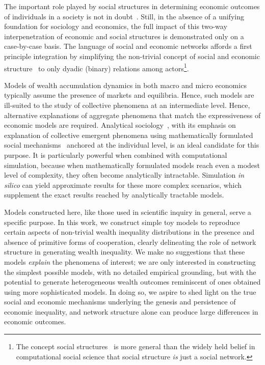 \documentclass[sigconf]{acmart}
\begin{document}
The important role played by social structures in determining economic outcomes of individuals in a society is not in doubt~\cite{granovetter2005, jackson_rev2017}. Still, in the absence of a unifying foundation for sociology and economics, the full impact of this two-way interpenetration of economic and social structures is demonstrated only on a case-by-case basis. The language of social and economic networks affords a first principle integration by simplifying the non-trivial concept of social and economic structure~\cite{martin_lee} to only dyadic (binary) relations among actors\footnote{The concept social structures~\cite{martin_lee} is more general than the widely held belief in computational social science that social structure \textit{is} just a social network.}. 

Models of wealth accumulation dynamics in both macro and micro economics typically assume the presence of markets and equilibria. Hence, such models are ill-suited to the study of collective phenomena at an intermediate level. Hence, alternative explanations of aggregate phenomena that match the expressiveness of economic models are required. Analytical sociology~\cite{ch1as_hdbk}, with its emphasis on explanation of collective emergent phenomena using mathematically formulated social mechanisms~\cite{ch2as_hdbk,ch11as_hdbk} anchored at the individual level, is an ideal candidate for this purpose. It is particularly powerful when combined with computational simulation, because when mathematically formulated models reach even a modest level of complexity, they often become analytically intractable. Simulation \textit{in silico} can yield approximate results for these more complex scenarios, which supplement the exact results reached by analytically tractable models. 

Models constructed here, like those used in scientific inquiry in general, serve a specific purpose. In this work, we construct simple toy models to reproduce certain aspects of non-trivial wealth inequality distributions in the presence and absence of primitive forms of cooperation, clearly delineating the role of network structure in generating wealth inequality. We make no suggestions that these models \textit{explain} the phenomena of interest; we are only interested in constructing the simplest possible models, with no detailed empirical grounding, but with the potential to generate heterogeneous wealth outcomes reminiscent of ones obtained using more sophisticated models. In doing so, we aspire to shed light on the true social and economic mechanisms underlying the genesis and persistence of economic inequality, and network structure alone can produce large differences in economic outcomes. 
\end{document}
